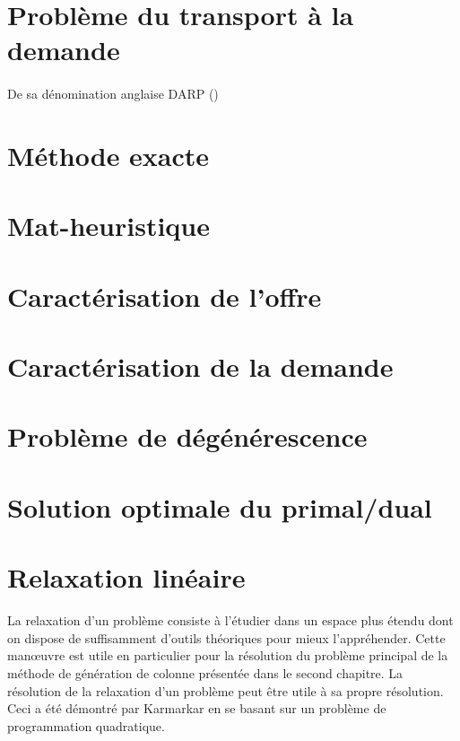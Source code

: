 \documentclass{article}
\begin{document}
\section{Problème du transport à la demande}
\paragraph{}
De sa dénomination anglaise DARP ()


\section{Méthode exacte}


\section{Mat-heuristique}

\section{Caractérisation de l'offre}

\section{Caractérisation de la demande}

\section{Problème de dégénérescence}

\section{Solution optimale du primal/dual}

\section{Relaxation linéaire}
La relaxation d'un problème consiste à l'étudier dans un espace plus étendu dont on dispose de suffisamment d'outils théoriques pour mieux l'appréhender. Cette manœuvre est utile en particulier pour la résolution du problème principal de la méthode de génération de colonne présentée dans le second chapitre. La résolution de la relaxation d'un problème peut être utile à sa propre résolution. Ceci a été démontré par Karmarkar \cite{Karmarkar} en se basant sur un problème de programmation quadratique.
\end{document}
